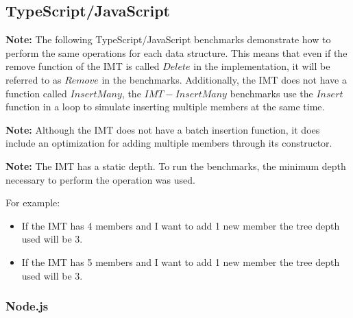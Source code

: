 \documentclass{article}
\begin{document}
\subsection{TypeScript/JavaScript}

\textbf{Note:} The following TypeScript/JavaScript benchmarks demonstrate how to perform the same operations for each data structure. This means that even if the remove function of the IMT is called $Delete$ in the implementation, it will be referred to as $Remove$ in the benchmarks. Additionally, the IMT does not have a function called $InsertMany$, the $IMT - InsertMany$ benchmarks use the $Insert$ function in a loop to simulate inserting multiple members at the same time.

\textbf{Note:} Although the IMT does not have a batch insertion function, it does include an optimization for adding multiple members through its constructor.

\textbf{Note:} The IMT has a static depth. To run the benchmarks, the minimum depth necessary to perform the operation was used.

For example:

\begin{itemize}
    \item If the IMT has 4 members and I want to add 1 new member the tree depth used will be 3.
    \item If the IMT has 5 members and I want to add 1 new member the tree depth used will be 3.
\end{itemize}


\subsubsection{Node.js}

\datatable

\begin{table}[H]
    \centering
    \caption{All Functions in Node.js (100 iterations)}
    \pgfplotstabletypeset[
        col sep=comma,
        header=true,
        string type, %
        every head row/.style={before row=\toprule, after row=\midrule},
        every last row/.style={after row=\bottomrule},
    ]{\datatable}
\end{table}
\end{document}
